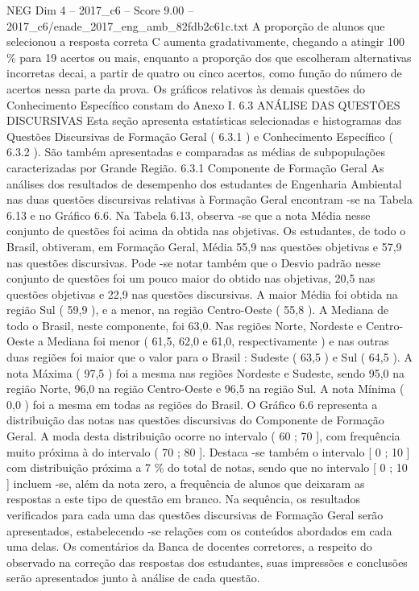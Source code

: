 \begin{textsample}{NEG Dim 4 – 2017\_c6 – Score 9.00 – 2017\_c6/enade\_2017\_eng\_amb\_82fdb2c61c.txt}
A proporção de alunos que selecionou a resposta correta C aumenta gradativamente, chegando a atingir 100 \% para 19 acertos ou mais, enquanto a proporção dos que escolheram alternativas incorretas decai, a partir de quatro ou cinco acertos, como função do número de acertos nessa parte da prova.
Os gráficos relativos às demais questões do Conhecimento Específico constam do Anexo I. 6.3 ANÁLISE DAS QUESTÕES DISCURSIVAS Esta seção apresenta estatísticas selecionadas e histogramas das Questões Discursivas de Formação Geral ( 6.3.1 ) e Conhecimento Específico ( 6.3.2 ).
São também apresentadas e comparadas as médias de subpopulações caracterizadas por Grande Região. 6.3.1 Componente de Formação Geral As análises dos resultados de desempenho dos estudantes de Engenharia Ambiental nas duas questões discursivas relativas à Formação Geral encontram -se na Tabela 6.13 e no Gráfico 6.6.
Na Tabela 6.13, observa -se que a nota Média nesse conjunto de questões foi acima da obtida nas objetivas.
Os estudantes, de todo o Brasil, obtiveram, em Formação Geral, Média 55,9 nas questões objetivas e 57,9 nas questões discursivas.
Pode -se notar também que o Desvio padrão nesse conjunto de questões foi um pouco maior do obtido nas objetivas, 20,5 nas questões objetivas e 22,9 nas questões discursivas.
A maior Média foi obtida na região Sul ( 59,9 ), e a menor, na região Centro-Oeste ( 55,8 ).
A Mediana de todo o Brasil, neste componente, foi 63,0.
Nas regiões Norte, Nordeste e Centro-Oeste a Mediana foi menor ( 61,5, 62,0 e 61,0, respectivamente ) e nas outras duas regiões foi maior que o valor para o Brasil : Sudeste ( 63,5 ) e Sul ( 64,5 ).
A nota Máxima ( 97,5 ) foi a mesma nas regiões Nordeste e Sudeste, sendo 95,0 na região Norte, 96,0 na região Centro-Oeste e 96,5 na região Sul.
A nota Mínima ( 0,0 ) foi a mesma em todas as regiões do Brasil.
O Gráfico 6.6 representa a distribuição das notas nas questões discursivas do Componente de Formação Geral.
A moda desta distribuição ocorre no intervalo ( 60 ; 70 ], com frequência muito próxima à do intervalo ( 70 ; 80 ].
Destaca -se também o intervalo [ 0 ; 10 ] com distribuição próxima a 7 \% do total de notas, sendo que no intervalo [ 0 ; 10 ] incluem -se, além da nota zero, a frequência de alunos que deixaram as respostas a este tipo de questão em branco.
Na sequência, os resultados verificados para cada uma das questões discursivas de Formação Geral serão apresentados, estabelecendo -se relações com os conteúdos abordados em cada uma delas.
Os comentários da Banca de docentes corretores, a respeito do observado na correção das respostas dos estudantes, suas impressões e conclusões serão apresentados junto à análise de cada questão.

\end{textsample}
